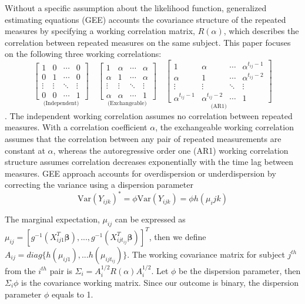 \documentclass[
]{aft}
\begin{document}
Without a specific assumption about the likelihood function, generalized
estimating equations (GEE) accounts the covariance structure of the
repeated measures by specifying a working correlation matrix,
\(R(\alpha)\), which describes the correlation between repeated measures
on the same subject. This paper focuses on the following three working
correlations: \[
\underset{\text{(Independent)}}{\begin{bmatrix}
1 & 0 & \cdots & 0\\
0 & 1 & \cdots &  0\\
\vdots & \vdots & \ddots & \vdots\\
0 & 0 & \cdots & 1
\end{bmatrix}}
\quad
\underset{\text{(Exchangeable)}}{\begin{bmatrix}
1 & \alpha & \cdots & \alpha\\
\alpha & 1 & \cdots & \alpha\\
\vdots & \vdots & \ddots & \vdots\\
\alpha & \alpha & \cdots & 1
\end{bmatrix}}
\quad
\underset{\text{(AR1)}}{\begin{bmatrix}
1 & \alpha & \cdots & \alpha^{t_{ij} - 1}\\
\alpha & 1 & \cdots & \alpha^{t_{ij} - 2}\\
\vdots & \vdots & \ddots & \vdots\\
\alpha^{t_{ij} - 1} & \alpha^{t_{ij} - 2} & \cdots & 1
\end{bmatrix}}
\] . The independent working correlation assumes no correlation between
repeated measures. With a correlation coefficient \(\alpha\), the
exchangeable working correlation assumes that the correlation between
any pair of repeated measurements are constant at \(\alpha\), whereas
the autoregressive order one (AR1) working correlation structure assumes
correlation decreases exponentially with the time lag between measures.
GEE approach accounts for overdispersion or underdispersion by
correcting the variance using a dispersion parameter \[
\text{Var}(Y_{ijk})^* = \phi\text{Var}(Y_{ijk}) = \phi h(\mu_ijk)
\]

The marginal expectation, \(\mu_{ij}\) can be expressed as
\(\mu_{ij} = \left[g^{-1}(X_{ij1}^T \boldsymbol{\beta}), ..., g^{-1}(X_{ijt_{ij}}^T \boldsymbol{\beta})\right]^T\),
then we define \(A_{ij} = diag\{h(\mu_{ij1}),...h(\mu_{ijt_{ij}})\}\).
The working covariance matrix for subject \(j^{th}\) from the \(i^{th}\)
pair is \(\Sigma_i = A_i^{1/2}R(\alpha)A_i^{1/2}\). Let \(\phi\) be the
dispersion parameter, then \(\Sigma_i \phi\) is the covariance working
matrix. Since our outcome is binary, the dispersion parameter \(\phi\)
equals to 1.
\end{document}
